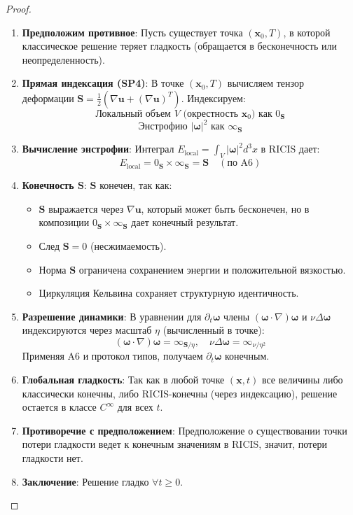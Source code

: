 \documentclass[12pt]{article}
\newcommand{\0}{\mathbf{0}}
\newcommand{\1}{\mathds{1}}
\newcommand{\bu}{\mathbf{u}}
\newcommand{\bomega}{\bm{\omega}}
\newcommand{\bx}{\mathbf{x}}
\newcommand{\bS}{\mathbf{S}}
\begin{document}
\begin{proof}
\begin{enumerate}
    \item \textbf{Предположим противное}: Пусть существует точка $(\bx_0,T)$, в которой классическое решение теряет гладкость (обращается в бесконечность или неопределенность).
    
    \item \textbf{Прямая индексация (SP4)}: В точке $(\bx_0,T)$ вычисляем тензор деформации $\bS = \frac{1}{2}(\nabla\bu + (\nabla\bu)^T)$. Индексируем:
    \[
    \text{Локальный объем } V \text{ (окрестность }\bx_0\text{) как } 0_{\bS}
    \]
    \[
    \text{Энстрофию } |\bomega|^2 \text{ как } \infty_{\bS}
    \]
    
    \item \textbf{Вычисление энстрофии}: Интеграл $E_{\text{local}} = \int_V |\bomega|^2 d^3x$ в RICIS дает:
    \[
    E_{\text{local}} = 0_{\bS} \times \infty_{\bS} = \bS \quad (\text{по A6})
    \]
    
    \item \textbf{Конечность $\bS$}: $\bS$ конечен, так как:
    \begin{itemize}
        \item $\bS$ выражается через $\nabla\bu$, который может быть бесконечен, но в композиции $0_{\bS} \times \infty_{\bS}$ дает конечный результат.
        \item След $\bS = 0$ (несжимаемость).
        \item Норма $\bS$ ограничена сохранением энергии и положительной вязкостью.
        \item Циркуляция Кельвина сохраняет структурную идентичность.
    \end{itemize}
    
    \item \textbf{Разрешение динамики}: В уравнении для $\partial_t\bomega$ члены $(\bomega\cdot\nabla)\bomega$ и $\nu\Delta\bomega$ индексируются через масштаб $\eta$ (вычисленный в точке):
    \[
    (\bomega\cdot\nabla)\bomega = \infty_{\bS/\eta}, \quad \nu\Delta\bomega = \infty_{\nu/\eta^2}
    \]
    Применяя A6 и протокол типов, получаем $\partial_t\bomega$ конечным.
    
    \item \textbf{Глобальная гладкость}: Так как в любой точке $(\bx,t)$ все величины либо классически конечны, либо RICIS-конечны (через индексацию), решение остается в классе $C^{\infty}$ для всех $t$.
    
    \item \textbf{Противоречие с предположением}: Предположение о существовании точки потери гладкости ведет к конечным значениям в RICIS, значит, потери гладкости нет.
    
    \item \textbf{Заключение}: Решение гладко $\forall t \geq 0$.
\end{enumerate}
\end{proof}
\end{document}
